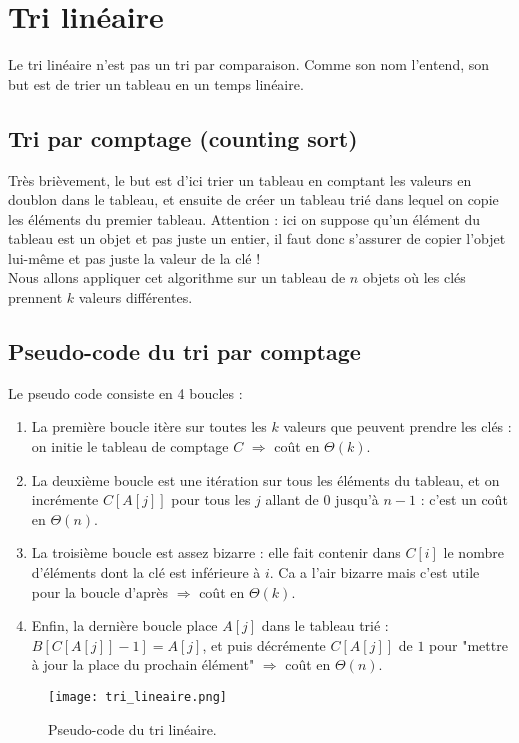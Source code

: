 \documentclass[12pt,a4paper]{book}
\begin{document}
\section{Tri linéaire}
Le tri linéaire n'est pas un tri par comparaison. Comme son nom l'entend, son but est de trier un tableau en un temps linéaire.
\subsection{Tri par comptage (counting sort)}
Très brièvement, le but est d'ici trier un tableau en comptant les valeurs en doublon dans le tableau, et ensuite de créer un tableau trié dans lequel on copie les éléments du premier tableau. Attention : ici on suppose qu'un élément du tableau est un objet et pas juste un entier, il faut donc s'assurer de copier l'objet lui-même et pas juste la valeur de la clé ! \\

Nous allons appliquer cet algorithme sur un tableau de $n$ objets où les clés prennent $k$ valeurs différentes.

\subsection{Pseudo-code du tri par comptage}
Le pseudo code consiste en 4 boucles :
\begin{enumerate}
\item La première boucle itère sur toutes les $k$ valeurs que peuvent prendre les clés : on initie le tableau de comptage $C$ $\Rightarrow$ coût en $\Theta(k)$.
\item La deuxième boucle est une itération sur tous les éléments du tableau, et on incrémente $C[A[j]]$ pour tous les $j$ allant de $0$ jusqu'à $n-1$ : c'est un coût en $\Theta(n)$.
\item La troisième boucle est assez bizarre : elle fait contenir dans $C[i]$ le nombre d'éléments dont la clé est inférieure à $i$. Ca a l'air bizarre mais c'est utile pour la boucle d'après $\Rightarrow$ coût en $\Theta(k)$.
\item Enfin, la dernière boucle place $A[j]$ dans le tableau trié : $B[C[A[j]] - 1] = A[j]$, et puis décrémente $C[A[j]]$ de $1$ pour "mettre à jour la place du prochain élément" $\Rightarrow$ coût en $\Theta(n )$.
\end{enumerate}

\begin{figure}[h]
\centering
\texttt{[image: tri\_lineaire.png]}
\caption{Pseudo-code du tri linéaire.}
\label{fig:tri_lineaire.png}
\end{figure}
\end{document}
